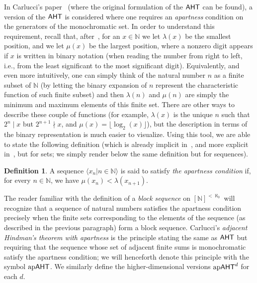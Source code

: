 \documentclass[10pt,a4paper]{amsart}
\newcommand{\aht}{\mathnormal{\mathsf{AHT}}}
\newcommand{\apaht}{\mathnormal{\mathrm{ap}\mathsf{AHT}}}
\theoremstyle{definition}
\newtheorem{definition}[theorem]{Definition}
\begin{document}
In Carlucci's paper~\cite{carlucci-adjacent} (where the original formulation of the $\aht$ can be found), a version of the $\aht$ is considered where one requires an {\it apartness} condition on the generators of the monochromatic set. In order to understand this requirement, recall that, after~\cite{blass-hirst-simpson}, for an $x\in\mathbb N$ we let $\lambda(x)$ be the smallest position, and we let $\mu(x)$ be the largest position, where a nonzero digit appears if $x$ is written in binary notation (when reading the number from right to left, i.e., from the least significant to the most significant digit). Equivalently, and even more intuitively, one can simply think of the natural number $n$ as a finite subset of $\mathbb N$ (by letting the binary expansion of $n$ represent the characteristic function of such finite subset) and then $\lambda(n)$ and $\mu(n)$ are simply the minimum and maximum elements of this finite set. There are other ways to describe these couple of functions (for example, $\lambda(x)$ is the unique $n$ such that $2^n\mid x$ but $2^{n+1}\nmid x$, and $\mu(x)=\lfloor\log_2(x)\rfloor$), but the description in terms of the binary representation is much easier to visualize. Using this tool, we are able to state the following definition (which is already implicit in~\cite{blass-hirst-simpson}, and more explicit in~\cite[Definition 3]{carlucci-adjacent}, but for sets; we simply render below the same definition but for sequences).

\begin{definition}
A sequence $\langle x_n\big|n\in\mathbb N\rangle$ is said to satisfy {\it the apartness condition} if, for every $n\in\mathbb N$, we have $\mu(x_n)<\lambda(x_{n+1})$.
\end{definition}

The reader familiar with the definition of a {\it block sequence} on $[\mathbb N]^{<\aleph_0}$ will recognize that a sequence of natural numbers satisfies the apartness condition precisely when the finite sets corresponding to the elements of the sequence (as described in the previous paragraph) form a block sequence. Carlucci's {\it adjacent Hindman's theorem with apartness} is the principle stating the same as $\aht$ but requiring that the sequence whose set of adjacent finite sums is monochromatic satisfy the apartness condition; we will henceforth denote this principle with the symbol $\apaht$. We similarly define the higher-dimensional versions $\apaht^d$ for each $d$.
\end{document}
